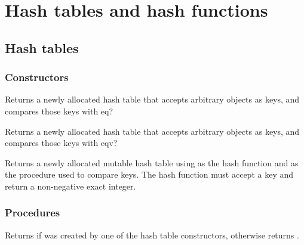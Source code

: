 \documentclass[twoside]{algol60}
\begin{document}
\chapter{Hash tables and hash functions}


\section{Hash tables}

\subsection{Constructors}


\begin{entry}{%
}

Returns a newly allocated hash table that accepts arbitrary objects 
as keys, and compares those keys with eq?

\end{entry}

\begin{entry}{%
}

Returns a newly allocated hash table that accepts arbitrary objects 
as keys, and compares those keys with eqv?

\end{entry}

\begin{entry}{%
}

Returns a newly allocated mutable hash table using  
as the hash function and  as the procedure used to 
compare keys.  The hash function must accept a key and return a 
non-negative exact integer.

\end{entry}

\subsection{Procedures}

\begin{entry}{%
}
Returns \schtrue{} if  was created by one of the hash table constructors, otherwise returns \schfalse.
\end{entry}
\end{document}
